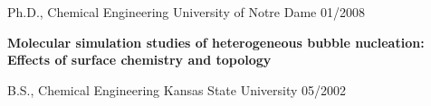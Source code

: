 
\begin{cventries}
  \cventry
    {Ph.D., Chemical Engineering} %
    {University of Notre Dame} %
    {} %
    {01/2008} %
    {
      \begin{cvitems} %
         \item {\textbf{Molecular simulation studies of heterogeneous bubble nucleation: Effects of surface chemistry and topology}}
      \end{cvitems}
    }
    
    \cventry
      {B.S., Chemical Engineering}
      {Kansas State University}
      {}
      {05/2002}
      {}

  \vspace{-10pt}
      

\end{cventries}

